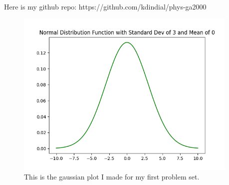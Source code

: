 \documentclass[11pt]{article}
\begin{document}
Here is my github repo: https://github.com/kdindial/phys-ga2000

\begin{figure}[b!]
\centering
\includegraphics[width=0.95\textwidth]{gaussian.png}
\caption{ \label{fig:example} This is the gaussian plot I made for my first problem set.}
\end{figure}
\end{document}
